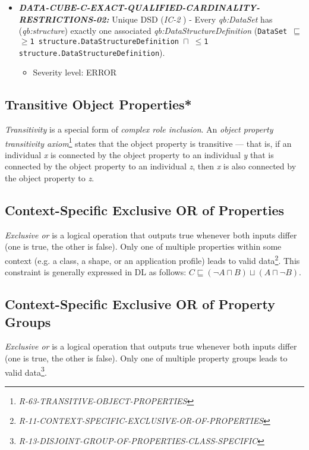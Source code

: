 \documentclass{llncs}
\newcommand{\ms}[1]{\texttt{#1}}
\begin{document}
\begin{itemize}
	\item \textbf{{\em DATA-CUBE-C-EXACT-QUALIFIED-CARDINALITY-RESTRICTIONS-02:}}
	Unique DSD (\emph{IC-2} \cite{CyganiakReynolds2014}) -  
	Every \emph{qb:DataSet} has (\emph{qb:structure}) exactly one associated \emph{qb:DataStructureDefinition} (\ms{DataSet $\sqsubseteq$ $\geq$1 structure.DataStructureDefinition $\sqcap$ $\leq$1 structure.DataStructureDefinition}). 
	\begin{itemize}
		\item Severity level: ERROR
	\end{itemize}
\end{itemize}

\subsection{Transitive Object Properties*}

\emph{Transitivity} is a special form of \emph{complex role inclusion}.
An \emph{object property transitivity axiom}\footnote{\emph{R-63-TRANSITIVE-OBJECT-PROPERTIES}} states that the object property is transitive — that is, if an individual \emph{x} is connected by the object property to an individual \emph{y} that is connected by the object property to an individual \emph{z}, then \emph{x} is also connected by the object property to \emph{z}.

\subsection{Context-Specific Exclusive OR of Properties}		

\emph{Exclusive or} is a logical operation that outputs true whenever both inputs differ (one is true, the other is false).
Only one of multiple properties within some context (e.g. a class, a shape, or an  application profile) leads to valid data\footnote{\emph{R-11-CONTEXT-SPECIFIC-EXCLUSIVE-OR-OF-PROPERTIES}}.
This constraint is generally expressed in DL as follows: \ms{$C \sqsubseteq (\neg A \sqcap B) \sqcup (A \sqcap \neg B)$}.

\subsection{Context-Specific Exclusive OR of Property Groups}

\emph{Exclusive or} is a logical operation that outputs true whenever both inputs differ (one is true, the other is false).
Only one of multiple property groups leads to valid data\footnote{{\em R-13-DISJOINT-GROUP-OF-PROPERTIES-CLASS-SPECIFIC}}.
\end{document}
